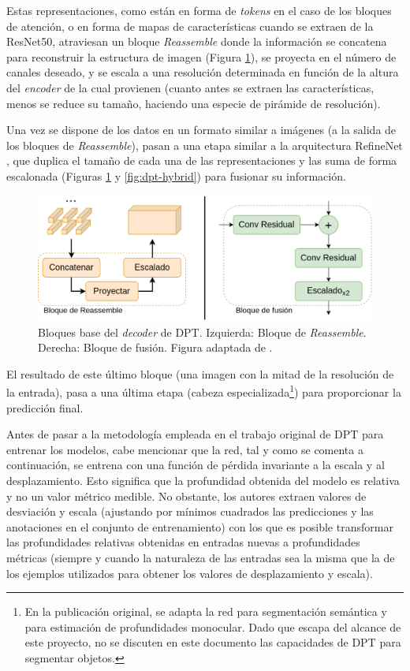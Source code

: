Estas representaciones, como están en forma de \textit{tokens} en el caso de los bloques de atención, o en forma de mapas de características cuando se extraen de la ResNet50, atraviesan un bloque \textit{Reassemble} donde la información se concatena para reconstruir la estructura de imagen (Figura \ref{fig:reassemble-fusion}), se proyecta en el número de canales deseado, y se escala a una resolución determinada en función de la altura del \textit{encoder} de la cual provienen (cuanto antes se extraen las características, menos se reduce su tamaño, haciendo una especie de pirámide de resolución).

Una vez se dispone de los datos en un formato similar a imágenes (a la salida de los bloques de \textit{Reassemble}), pasan a una etapa similar a la arquitectura RefineNet \cite{refinenet}, que duplica el tamaño de cada una de las representaciones y las suma de forma escalonada (Figuras \ref{fig:reassemble-fusion} y \ref{fig:dpt-hybrid}) para fusionar su información.

\begin{figure}[H]
\centering
\includegraphics[width=0.7\linewidth]{imagenes/reassemble-fusion.png} 
\captionsetup{width=.7\linewidth}
\caption{Bloques base del \textit{decoder} de DPT. Izquierda: Bloque de \textit{Reassemble}. Derecha: Bloque de fusión. Figura adaptada de \cite{visiontransformersDPT}.}
\label{fig:reassemble-fusion}
\end{figure}

El resultado de este último bloque (una imagen con la mitad de la resolución de la entrada), pasa a una última etapa (cabeza especializada\footnote{En la publicación original, se adapta la red para segmentación semántica y para estimación de profundidades monocular. Dado que escapa del alcance de este proyecto, no se discuten en este documento las capacidades de DPT para segmentar objetos.}) para proporcionar la predicción final.

Antes de pasar a la metodología empleada en el trabajo original de DPT para entrenar los modelos, cabe mencionar que la red, tal y como se comenta a continuación, se entrena con una función de pérdida invariante a la escala y al desplazamiento. Esto significa que la profundidad obtenida del modelo es relativa y no un valor métrico medible. No obstante, los autores extraen valores de desviación y escala (ajustando por mínimos cuadrados las predicciones y las anotaciones en el conjunto de entrenamiento) con los que es posible transformar las profundidades relativas obtenidas en entradas nuevas a profundidades métricas (siempre y cuando la naturaleza de las entradas sea la misma que la de los ejemplos utilizados para obtener los valores de desplazamiento y escala).

